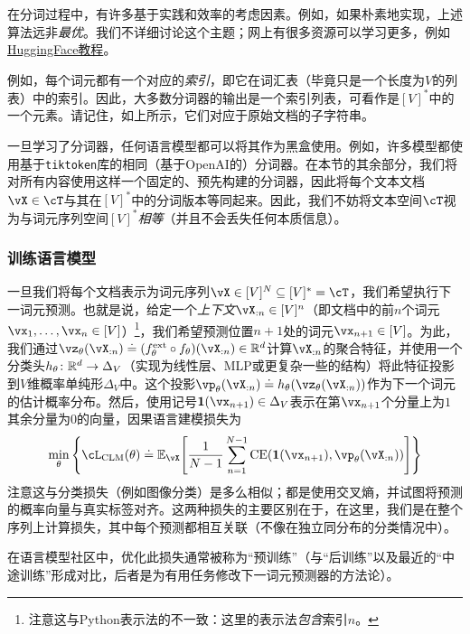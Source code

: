 \documentclass[../../book-main_zh.tex]{subfiles}
\begin{document}
在分词过程中，有许多基于实践和效率的考虑因素。例如，如果朴素地实现，上述算法远非\textit{最优}。我们不详细讨论这个主题；网上有很多资源可以学习更多，例如\href{https://huggingface.co/learn/nlp-course/en/chapter6/5}{HuggingFace教程}。

例如，每个词元都有一个对应的\textit{索引}，即它在词汇表（毕竟只是一个长度为\(V\)的列表）中的索引。因此，大多数分词器的输出是一个索引列表，可看作是\([V]^{*}\)中的一个元素。请记住，如上所示，它们对应于原始文档的子字符串。

一旦学习了分词器，任何语言模型都可以将其作为黑盒使用。例如，许多模型都使用基于\texttt{tiktoken}库的相同（基于OpenAI的）分词器。在本节的其余部分，我们将对所有内容使用这样一个固定的、预先构建的分词器，因此将每个文本文档\(\vX \in \cT\)与其在\([V]^{*}\)中的分词版本等同起来。因此，我们不妨将文本空间\(\cT\)视为与词元序列空间\([V]^{*}\)\textit{相等}（并且不会丢失任何本质信息）。

\subsubsection{训练语言模型}

一旦我们将每个文档表示为词元序列\(\vX \in [V]^{N} \subseteq [V]^{*} = \cT\)，我们希望执行下一词元预测。也就是说，给定一个\textit{上下文}\(\vX_{:n} \in [V]^{n}\)（即文档中的前\(n\)个词元\(\vx_{1}, \dots, \vx_{n} \in [V]\)）\footnote{注意这与Python表示法的不一致：这里的表示法\textit{包含}索引\(n\)。}，我们希望预测位置\(n + 1\)处的词元\(\vx_{n + 1} \in [V]\)。为此，我们通过\(\vz_{\theta}(\vX_{:n}) \doteq (f_{\theta}^{\ext} \circ f_{\theta})(\vX_{:n}) \in \R^{d}\)计算\(\vX_{:n}\)的聚合特征，并使用一个分类头\(h_{\theta} \colon \mathbb{R}^{d} \to \Delta_{V}\)（实现为线性层、MLP或更复杂一些的结构）将此特征投影到\(V\)维概率单纯形\(\Delta_{V}\)中。这个投影\(\vp_{\theta}(\vX_{:n}) \doteq h_{\theta}(\vz_{\theta}(\vX_{:n}))\)作为下一个词元的估计概率分布。然后，使用记号\(\vone(\vx_{n + 1}) \in \Delta_{V}\)表示在第\(\vx_{n + 1}\)个分量上为\(1\)其余分量为\(0\)的向量，因果语言建模损失为
\begin{equation}\label{eq:clm_loss}
    \min_{\theta}\bc{\cL_{\mathrm{CLM}}(\theta) \doteq \Ex_{\vX}\rs{\frac{1}{N - 1}\sum_{n = 1}^{N - 1}\CE(\vone(\vx_{n + 1}), \vp_{\theta}(\vX_{:n}))}}
\end{equation}
注意这与分类损失（例如图像分类）是多么相似；都是使用交叉熵，并试图将预测的概率向量与真实标签对齐。这两种损失的主要区别在于，在这里，我们是在整个序列上计算损失，其中每个预测都相互关联（不像在独立同分布的分类情况中）。

在语言模型社区中，优化此损失通常被称为“预训练”（与“后训练”以及最近的“中途训练”形成对比，后者是为有用任务修改下一词元预测器的方法论）。
\end{document}
